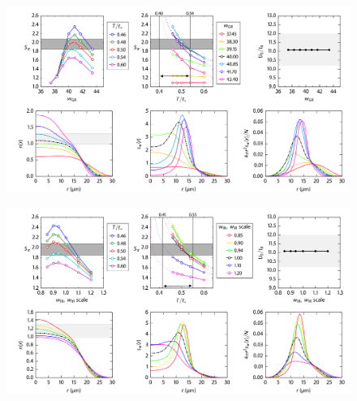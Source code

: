 \documentclass[11pt,letter]{article}
\begin{document}
\begin{figure}[H]
    \centering \includegraphics[width=\textwidth]{figures/05_wGR.png}
\caption{ }
\label{fig:05}
\end{figure}

\begin{figure}[H]
    \centering \includegraphics[width=\textwidth]{figures/06_wIR+wGR.png}
\caption{ }
\label{fig:06}
\end{figure}
 
 

\end{document}
